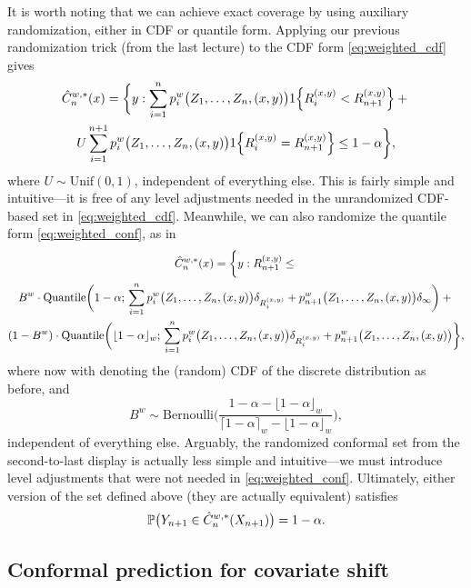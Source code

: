 \documentclass{article}
\begin{document}
It is worth noting that we can achieve exact coverage by using auxiliary
randomization, either in CDF or quantile form. Applying our previous
randomization trick (from the last lecture) to the CDF form
\eqref{eq:weighted_cdf} gives  
\begin{multline*}
\hat{C}_n^{w,*}(x) = \bigg\{ y : \sum_{i=1}^n p^w_i\big( Z_1,\dots,Z_n,(x,y)
\big) 1\Big\{ R_i^{(x,y)} < R^{(x,y)}_{n+1} \Big\} +{} \\ U \sum_{i=1}^{n+1} 
p^w_i\big( Z_1,\dots,Z_n,(x,y) \big) 1\Big\{ R_i^{(x,y)} = R^{(x,y)}_{n+1}
\Big\} \leq 1-\alpha \bigg\},
\end{multline*}
where $U \sim \mathrm{Unif}(0,1)$, independent of everything else. This is
fairly simple and intuitive---it is free of any level adjustments needed in the   
unrandomized CDF-based set in \eqref{eq:weighted_cdf}. Meanwhile, we can also 
randomize the quantile form \eqref{eq:weighted_conf}, as in  
\begin{multline*}
\hat{C}^{w,*}_n(x) = \bigg\{ y : R_{n+1}^{(x,y)} \leq {} \\
B^w \cdot \mathrm{Quantile}\bigg( 1-\alpha; \, \sum_{i=1}^n p^w_i\big(
Z_1,\dots,Z_n,(x,y) \big) \delta_{R_i^{(x,y)}} + p^w_{n+1}\big(
Z_1,\dots,Z_n,(x,y) \big) \delta_\infty \bigg) +{} \\ 
(1-B^w) \cdot \mathrm{Quantile}\bigg( \lfloor 1-\alpha \rfloor_w; \, 
\sum_{i=1}^n p^w_i\big( Z_1,\dots,Z_n,(x,y) \big) \delta_{R_i^{(x,y)}} +
p^w_{n+1}\big( Z_1,\dots,Z_n,(x,y) \big) \bigg\},     
\end{multline*}
where now  with 
denoting the (random) CDF of the discrete distribution  as before, and  
\[
B^w \sim \mathrm{Bernoulli}\bigg( \frac{1-\alpha - \lfloor 1-\alpha \rfloor_w}
{\lceil 1-\alpha \rceil_w - \lfloor 1-\alpha \rfloor_w} \bigg),
\]
independent of everything else. Arguably, the randomized conformal set from 
the second-to-last display is actually less simple and intuitive---we must
introduce level adjustments that were not needed in
\eqref{eq:weighted_conf}. Ultimately, either version of the set
 defined above (they are actually equivalent) satisfies       
\[
\mathbb{P}\big( Y_{n+1} \in \hat{C}^{w,*}_n(X_{n+1}) \big) = 1-\alpha.  
\]

\subsection{Conformal prediction for covariate shift}
\end{document}
